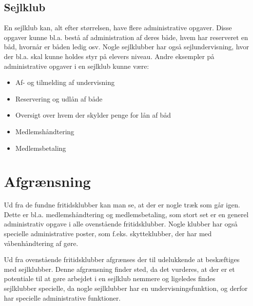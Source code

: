 \subsection{Sejlklub}

En sejlklub kan, alt efter størrelsen, have flere administrative opgaver. Disse opgaver kunne bl.a. bestå af
administration af deres både, hvem har reserveret en båd, hvornår er båden ledig osv. Nogle sejlklubber har
også sejlundervisning, hvor der bl.a. skal kunne holdes styr på elevers niveau. Andre eksempler på
administrative opgaver i en sejlklub kunne være:

\begin{itemize}
  \item Af- og tilmelding af undervisning
  \item Reservering og udlån af både
  \item Oversigt over hvem der skylder penge for lån af båd
  \item Medlemshåndtering
  \item Medlemsbetaling
\end{itemize}

\section{Afgrænsning}

Ud fra de fundne fritidsklubber kan man se, at der er nogle træk som går igen. Dette er bl.a. medlemshåndtering og
medlemsbetaling, som stort set er en generel administrativ opgave i alle ovenstående fritidsklubber. Nogle klubber har
også specielle administrative poster, som f.eks. skytteklubber, der har med våbenhåndtering af gøre.

Ud fra ovenstående fritidsklubber afgrænses der til udelukkende at beskæftiges med sejlklubber. Denne afgrænsning finder
sted, da det vurderes, at der er et potentiale til at gøre arbejdet i en sejlklub nemmere og ligeledes findes
sejlklubber specielle, da nogle sejlklubber har en undervisningsfunktion, og derfor har specielle administrative
funktioner.
